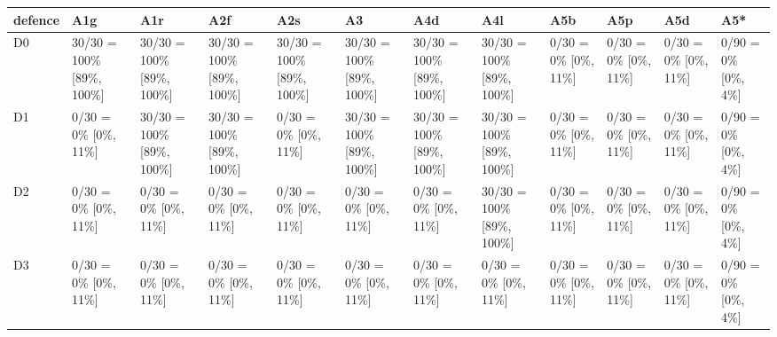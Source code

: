 \begin{tabular}{llllllllllll}
\toprule
defence & A1g & A1r & A2f & A2s & A3 & A4d & A4l & A5b & A5p & A5d & A5* \\
\midrule
D0 & 30/30 = 100\% [89\%, 100\%] & 30/30 = 100\% [89\%, 100\%] & 30/30 = 100\% [89\%, 100\%] & 30/30 = 100\% [89\%, 100\%] & 30/30 = 100\% [89\%, 100\%] & 30/30 = 100\% [89\%, 100\%] & 30/30 = 100\% [89\%, 100\%] & 0/30 = 0\% [0\%, 11\%] & 0/30 = 0\% [0\%, 11\%] & 0/30 = 0\% [0\%, 11\%] & 0/90 = 0\% [0\%, 4\%] \\
D1 & 0/30 = 0\% [0\%, 11\%] & 30/30 = 100\% [89\%, 100\%] & 30/30 = 100\% [89\%, 100\%] & 0/30 = 0\% [0\%, 11\%] & 30/30 = 100\% [89\%, 100\%] & 30/30 = 100\% [89\%, 100\%] & 30/30 = 100\% [89\%, 100\%] & 0/30 = 0\% [0\%, 11\%] & 0/30 = 0\% [0\%, 11\%] & 0/30 = 0\% [0\%, 11\%] & 0/90 = 0\% [0\%, 4\%] \\
D2 & 0/30 = 0\% [0\%, 11\%] & 0/30 = 0\% [0\%, 11\%] & 0/30 = 0\% [0\%, 11\%] & 0/30 = 0\% [0\%, 11\%] & 0/30 = 0\% [0\%, 11\%] & 0/30 = 0\% [0\%, 11\%] & 30/30 = 100\% [89\%, 100\%] & 0/30 = 0\% [0\%, 11\%] & 0/30 = 0\% [0\%, 11\%] & 0/30 = 0\% [0\%, 11\%] & 0/90 = 0\% [0\%, 4\%] \\
D3 & 0/30 = 0\% [0\%, 11\%] & 0/30 = 0\% [0\%, 11\%] & 0/30 = 0\% [0\%, 11\%] & 0/30 = 0\% [0\%, 11\%] & 0/30 = 0\% [0\%, 11\%] & 0/30 = 0\% [0\%, 11\%] & 0/30 = 0\% [0\%, 11\%] & 0/30 = 0\% [0\%, 11\%] & 0/30 = 0\% [0\%, 11\%] & 0/30 = 0\% [0\%, 11\%] & 0/90 = 0\% [0\%, 4\%] \\
\bottomrule
\end{tabular}
